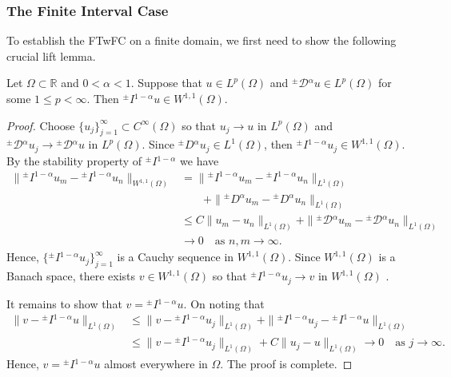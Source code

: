 \documentclass[leqno,final]{siamltex}
\numberwithin{equation}{section}
\renewcommand{\(}{\bigl(}
\renewcommand{\)}{\bigr)}
\newcommand{\R}{\mathbb{R}}
\begin{document}
\subsubsection{\bf The Finite Interval Case}\label{sec-4.6.1}
To establish the FTwFC on a finite domain, 
we first need to show the following crucial lift lemma.
   
   \begin{lemma}\label{FTFCConstant}
    Let $\Omega\subset \R$ and $0<\alpha <1$. Suppose that  $u \in L^{p}(\Omega)$ and  ${^{\pm}}{\mathcal{D}}{^{\alpha}}u \in L^{p}(\Omega)$ for some $1 \leq p < \infty$. 
    Then ${^{\pm}}{I}{^{1-\alpha}}u \in  W^{1,1}(\Omega)$. 
    \end{lemma}
   
   \begin{proof}
       Choose $\{u_j\}_{j=1}^{\infty} \subset C^{\infty}(\Omega)$ so that $u_j \rightarrow u$ in $L^{p}(\Omega)$ and ${^{\pm}}{\mathcal{D}}{^{\alpha}}u_j \rightarrow {^{\pm}}{\mathcal{D}}{^{\alpha}}u$ in $L^{p}(\Omega)$. Since ${^{\pm}}{D}{^{\alpha}}u_j \in L^{1}(\Omega)$, 
       then ${^{\pm}}{I}{^{1-\alpha}} u_j \in W^{1,1}(\Omega) $.  
       By the stability property of ${^{\pm}}{I}{^{1-\alpha}}$ we have
       \begin{align*}
           \|{^{\pm}}{I}{^{1-\alpha}} u_m - {^{\pm}}{I}{^{1-\alpha}} u_n\|_{ W^{1,1}(\Omega)}         
           &=\|{^{\pm}}{I}{^{1-\alpha}} u_m - {^{\pm}}{I}{^{1-\alpha}} u_n\|_{L^{1}(\Omega)} \\
           &\qquad  + \|{^{\pm}}{D}{^{\alpha}} u_m - {^{\pm}}{D}{^{\alpha}} u_n \|_{L^{1}(\Omega) } \nonumber \\ 
           &\leq C \|u_m - u_n\|_{L^{1} (\Omega)} + \| {^{\pm}}{\mathcal{D}}{^{\alpha}}u_m - {^{\pm}}{\mathcal{D}}{^{\alpha}} u_n \|_{L^{1}(\Omega)}\\
           &\to 0\quad\mbox{as } n,m\to \infty.
       \end{align*}
       Hence,  $\{{^{\pm}}{I}{^{1-\alpha}}u_j\}_{j=1}^{\infty}$ is a Cauchy sequence in $W^{1,1}(\Omega)$. Since $W^{1,1}(\Omega)$ is a Banach space, there exists $v \in W^{1,1}(\Omega)$ so that ${^{\pm}}{I}{^{1-\alpha}}u_j \rightarrow v$ in $W^{1,1}(\Omega)$ . 
       
       It remains to show that $v = {^{\pm}}{I}{^{1-\alpha}}u$. On noting that  
       \begin{align*}
        \|v - {^{\pm}}{I}{^{1-\alpha}}u\|_{L^1(\Omega)}
        &  \leq \|v - {^{\pm}}{I}{^{1-\alpha}}u_j \|_{L^{1}(\Omega)} + \|{^{\pm}}{I}{^{1-\alpha}} u_j - {^{\pm}}{I}{^{1-\alpha}} u \|_{L^{1}(\Omega)}  \\
        &\leq \|v - {^{\pm}}{I}{^{1-\alpha}}u_j \|_{L^{1}(\Omega)} + C \| u_j -  u \|_{L^{1}(\Omega)} 
        \to 0 \quad \mbox{as } j\to \infty.
       \end{align*}
       Hence,  $v = {^{\pm}}{I}{^{1-\alpha}} u$ almost everywhere in $\Omega$. The proof is complete.
   \end{proof}
\end{document}
